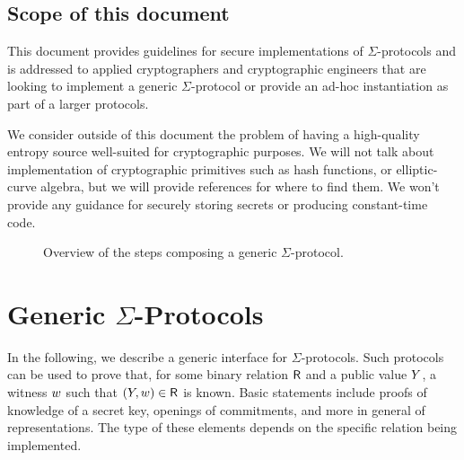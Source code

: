 \documentclass[11pt]{article}
\begin{document}
\subsection{Scope of this document}

This document provides guidelines for secure implementations of $\Sigma$-protocols and is addressed to applied cryptographers and cryptographic engineers that are looking to implement a generic
$\Sigma$-protocol or provide an ad-hoc instantiation as part of a larger protocols.

We consider outside of this document the problem of having a high-quality
entropy source well-suited for crypto\-graphic purposes.
We will not talk about implementation of cryptographic primitives such as hash functions, or elliptic-curve algebra, but we will provide references for where to find them.
We won't provide any guidance for securely storing secrets or producing constant-time code.



\begin{figure}[t]
  \begin{tcolorbox}
    \centering
  \end{tcolorbox}
  \caption{Overview of the steps composing a generic $\Sigma$-protocol.}
\end{figure}

\section{Generic $\Sigma$-Protocols}
In the following, we describe a generic interface for $\Sigma$-protocols.
Such protocols can be used to prove that, for some binary relation $\mathsf{R}$ and a public value $Y$, a witness $w$ such that $(Y,w)\in\mathsf{R}$ is known.
Basic statements include proofs of knowledge of a secret key, openings of commitments, and more in general of representations.
The type of these elements depends on the specific relation being implemented.
\end{document}

